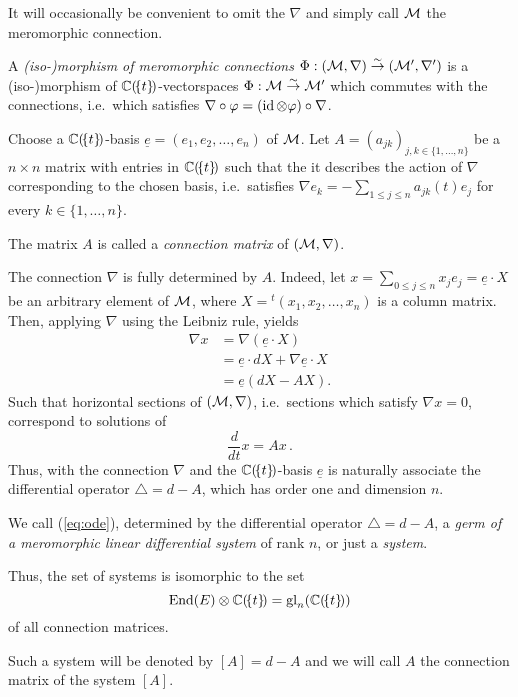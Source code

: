 It will occasionally be convenient to omit the $\nabla$ and simply call $\mathcal{M}$
the meromorphic connection.
\begin{defn}
  A \emph{(iso-)morphism of meromorphic connections}
  $\Phi:(\mathcal{M},\nabla)\overset{\sim}\to(\mathcal{M}',\nabla')$ is a (iso-)morphism of
  $\mathbb{C}(\!\{t\}\!)$-vectorspaces $\Phi:\mathcal{M}\overset{\sim}\to\mathcal{M}'$ which commutes
  with the connections, i.e.\ which satisfies
  $\nabla\circ\varphi = (\operatorname{id}\otimes\varphi)\circ\nabla$.
\end{defn}
Choose a $\mathbb{C}(\!\{t\}\!)$-basis $\underline{e}=(e_1,e_2,\dots,e_n)$ of $\mathcal{M}$.
Let $A=(a_{jk})_{j,k\in\{1,\dots,n\}}$ be a $n\times n$ matrix with entries in
$\mathbb{C}(\!\{t\}\!)$ such that the it describes the action of $\nabla$ corresponding
to the chosen basis, i.e.\ satisfies
 $\nabla e_k=-\sum_{1\leq j\leq n} a_{jk}(t)e_j$ for every $k\in\{1,\dots,n\}$.
\begin{defn}
  The matrix $A$ is called a \emph{connection matrix} of $(\mathcal{M},\nabla)$.
\end{defn}
The connection $\nabla$ is fully determined by $A$. Indeed, let
$x=\sum_{0\leq j\leq n}x_je_j=\underline{e}\cdot X$ be an arbitrary element of
$\mathcal{M}$, where $X={}^t\!(x_1,x_2 ,\dots,x_n)$ is a column matrix.
Then, applying $\nabla$ using the Leibniz rule, yields
\begin{align*}
  \nabla x&=\nabla\left(\underline{e}\cdot X\right)
  \\&=\underline{e} \cdot dX + \nabla \underline{e} \cdot X
  \\&=\underline{e}\left(dX-AX\right).
\end{align*}
Such that horizontal sections of $(\mathcal{M},\nabla)$, i.e.\ sections which satisfy
$\nabla x=0$, correspond to solutions of
\begin{equation}\label{eq:ode}
  \frac{d}{dt}x=Ax \,.
\end{equation}
Thus, with the connection $\nabla$ and the $\mathbb{C}(\!\{t\}\!)$-basis
$\underline{e}$ is naturally associate the differential operator
$\triangle=d-A$, which has order one and dimension $n$.
\begin{defn}
  We call (\ref{eq:ode}), determined by the differential operator
  $\triangle=d-A$, a \emph{germ of a meromorphic linear differential
  system\footnotemark} of rank $n$, or just a
  \emph{system}.
  \begin{s-prop}
    Thus, the set of systems is isomorphic to the set
    \[
      \operatorname{End}(E)\otimes\mathbb{C}(\!\{t\}\!)=\operatorname{gl}_n(\mathbb{C}(\!\{t\}\!))
    \]
    of all connection matrices.
  \end{s-prop}
  Such a system will be denoted by $[A]=d-A$ and we will call $A$ the
  connection matrix of the system $[A]$.
\end{defn}

